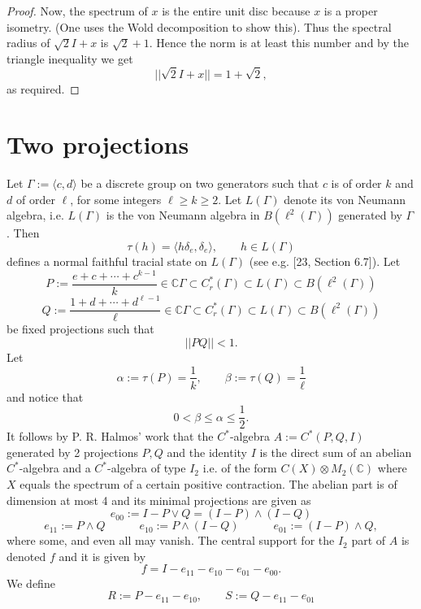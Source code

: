 \documentclass{amsart}
\newcommand{\C}{\mathbb C}
\theoremstyle{definition}
\begin{document}
\begin{proof}
Now, the spectrum of $x$ is the entire unit disc because $x$ is a proper isometry. (One uses the Wold decomposition to show this).
Thus the spectral radius of $\sqrt{2}I + x$ is $\sqrt{2} +1$. Hence the norm is at least this number and by the triangle inequality we get
$$ ||\sqrt{2}I + x|| = 1 + \sqrt{2}, $$ 
as required.
\end{proof}







\section{\textbf{Two projections}}
Let $\Gamma:=\langle c,d\rangle$ be a discrete group on two generators such that $c$ is of order $k$ and $d$ of order $\ell$, for some integers $\ell\ge k\ge 2$.
Let $L(\Gamma)$ denote its von Neumann algebra, i.e. $L(\Gamma)$ is the von Neumann algebra in $B(\ell^2(\Gamma))$ generated by $\Gamma$. Then
$$\tau(h) = \langle h\delta_e,\delta_e\rangle,\qquad h \in L(\Gamma)$$
defines a normal faithful tracial state on $L(\Gamma)$ (see e.g. [23, Section 6.7]). 
Let 
$$P:=\frac{e+c+\cdots+c^{k-1}}{k}\in\C\Gamma\subset C_r^*(\Gamma)\subset L(\Gamma)\subset B(\ell^2(\Gamma))$$
$$Q:=\frac{1+d+\cdots+d^{\ell-1}}{\ell}\in\C\Gamma\subset C_r^*(\Gamma)\subset L(\Gamma)\subset B(\ell^2(\Gamma))$$
 be fixed projections such that 
$$||PQ||<1.$$ 
Let 
$$\alpha:=\tau(P)=\frac1k,\qquad \beta:=\tau(Q)=\frac1{\ell}$$
and notice that $$ 0< \beta \le \alpha\le \frac12.$$
It follows by P. R. Halmos' work \cite{Halmos} that the $C^*$-algebra $A:=C^*(P,Q,I)$ generated by 2 projections $P,Q$ and the identity $I$ is the direct sum of an abelian $C^*$-algebra and a $C^*$-algebra of type $I_2$ i.e. of the form $C(X)\otimes M_2(\C)$ where $X$ equals the spectrum of a certain positive contraction.
The abelian part is of dimension at most 4 and its minimal projections are given as
$$ e_{00}:=I-P\lor Q=(I-P)\land(I-Q)$$
$$e_{11}:=P\land Q\quad\qquad e_{10}:=P\land (I-Q)\quad\qquad e_{01}:=(I-P)\land Q,$$
where some, and even all may vanish.
The central support for the $I_2$ part of $A$ is denoted $f$ and it is given by
\begin{equation}\label{e:f}
f=I-e_{11}-e_{10}-e_{01}-e_{00}.
\end{equation}
We define
\begin{equation}\label{e:R-S}
R:=P-e_{11}-e_{10},\qquad S:=Q-e_{11}-e_{01}
\end{equation}
\end{document}
